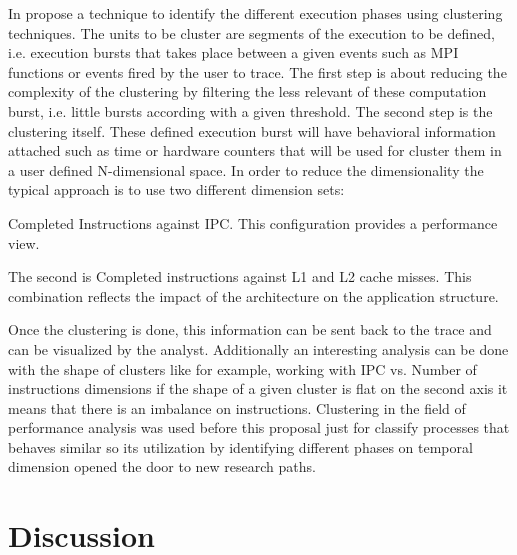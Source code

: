 In \cite{gonzalez2013application} propose a
technique to identify the different execution phases using clustering 
techniques. The units to be cluster are segments of the execution to be defined,
i.e. execution bursts that takes place between a given events such as MPI
functions or events fired by the user to trace. The first step is about reducing 
the complexity of the clustering by filtering the less relevant of these 
computation burst, i.e. little bursts according with a given threshold. The 
second step is the clustering itself. These defined execution burst will have
behavioral information attached such as time or hardware counters that will be
used for cluster them in a user defined N-dimensional space. In order to 
reduce the dimensionality the typical approach is to
use two different dimension sets: 
\begin{enumerate*}[label=\roman*)]
  \item  Completed Instructions against IPC. This configuration provides a
        performance view. 
  \item  The second is Completed instructions against L1 and L2 cache
        misses. This combination reflects the impact of the architecture on the
        application structure. 
\end{enumerate*}
Once the clustering is done, this information
can be sent back to the trace and can be visualized by the analyst. Additionally
an interesting analysis can be done with the shape of clusters like for example,
working with IPC vs. Number of instructions dimensions if the shape of a given 
cluster is
flat on the second axis it means that there is an imbalance on instructions.
Clustering in the field of performance analysis was used before this proposal 
just for classify processes that behaves similar so its utilization by
identifying different phases on temporal dimension opened the door to new research
paths.

\section{Discussion}\label{s:soa_discussion}

